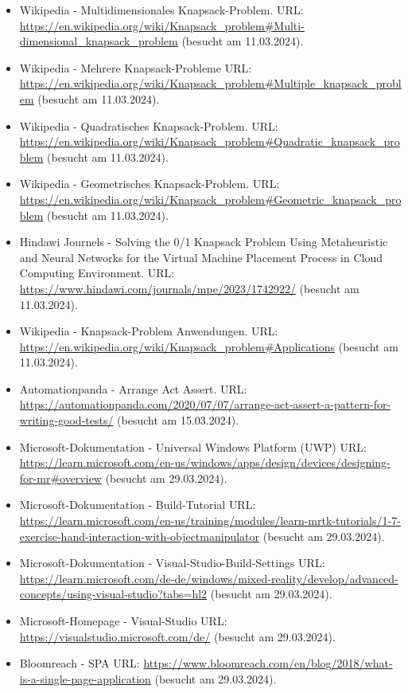 \begin{itemize}[leftmargin=0pt]
    \item Wikipedia - Multidimensionales Knapsack-Problem. {\scriptsize URL:} \url{https://en.wikipedia.org/wiki/Knapsack_problem#Multi-dimensional_knapsack_problem} (besucht am 11.03.2024).
    \item Wikipedia - Mehrere Knapsack-Probleme {\scriptsize URL:} \url{https://en.wikipedia.org/wiki/Knapsack_problem#Multiple_knapsack_problem} (besucht am 11.03.2024).
    \item Wikipedia - Quadratisches Knapsack-Problem. {\scriptsize URL:} \url{https://en.wikipedia.org/wiki/Knapsack_problem#Quadratic_knapsack_problem} (besucht am 11.03.2024).
    \item Wikipedia - Geometrisches Knapsack-Problem. {\scriptsize URL:} \url{https://en.wikipedia.org/wiki/Knapsack_problem#Geometric_knapsack_problem} (besucht am 11.03.2024).
    \item Hindawi Journels - Solving the 0/1 Knapsack Problem Using Metaheuristic and Neural Networks for the Virtual Machine Placement Process in Cloud Computing Environment. {\scriptsize URL:} \url{https://www.hindawi.com/journals/mpe/2023/1742922/} (besucht am 11.03.2024).
    \item Wikipedia - Knapsack-Problem Anwendungen. {\scriptsize URL:} \url{https://en.wikipedia.org/wiki/Knapsack_problem#Applications} (besucht am 11.03.2024).
    \item Automationpanda - Arrange Act Assert. {\scriptsize URL:} \url{https://automationpanda.com/2020/07/07/arrange-act-assert-a-pattern-for-writing-good-tests/} (besucht am 15.03.2024).
    \item Microsoft-Dokumentation - Universal Windows Platform (UWP) {\scriptsize URL:} \url{https://learn.microsoft.com/en-us/windows/apps/design/devices/designing-for-mr#overview} (besucht am 29.03.2024).
    \item Microsoft-Dokumentation - Build-Tutorial {\scriptsize URL:} \url{https://learn.microsoft.com/en-us/training/modules/learn-mrtk-tutorials/1-7-exercise-hand-interaction-with-objectmanipulator} (besucht am 29.03.2024).
    \item Microsoft-Dokumentation - Visual-Studio-Build-Settings {\scriptsize URL:} \url{https://learn.microsoft.com/de-de/windows/mixed-reality/develop/advanced-concepts/using-visual-studio?tabs=hl2} (besucht am 29.03.2024).
    \item Microsoft-Homepage - Visual-Studio {\scriptsize URL:} \url{https://visualstudio.microsoft.com/de/} (besucht am 29.03.2024).
    \item Bloomreach - SPA {\scriptsize URL:} \url{https://www.bloomreach.com/en/blog/2018/what-is-a-single-page-application} (besucht am 29.03.2024).

\end{itemize}
